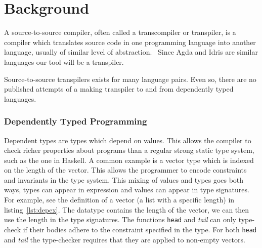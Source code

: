 \chapter{Background}

A source-to-source compiler, often called a transcompiler or transpiler, is
a compiler which translates source code in one programming language into
another language, usually of similar level of abstraction.~\cite{transpiler2015}
Since Agda and Idris are similar languages our tool will be a transpiler.

Source-to-source transpilers exists for many language pairs. Even so, there are
no published attempts of a making transpiler to and from dependently
typed languages.




\subsection{Dependently Typed Programming}

Dependent types are types which depend on values.
This allows the compiler to check richer properties about programs than
a regular strong static type system, such as the one in Haskell.
A common example is a vector type which is indexed on the length of
the vector. This allows the programmer to encode constraints and invariants in
the type system.
This mixing of values and types goes both ways, types can appear in expression
and values can appear in type signatures.
For example, see the definition of a vector (a list with a specific length) in
listing~\ref{lst:depex}. The datatype contains the length of the vector, we can
then use the length in the type signatures.
The functions \texttt{head} and \textit{tail} can only type-check if their
bodies adhere to the constraint specified in the type.
For both \texttt{head} and \textit{tail} the type-checker requires that they
are applied to non-empty vectors.



